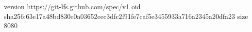 version https://git-lfs.github.com/spec/v1
oid sha256:63e17a48bd830e0a03652eec3dfc2f91fe7caf5e3455933a716a2345a20dfa23
size 8080
